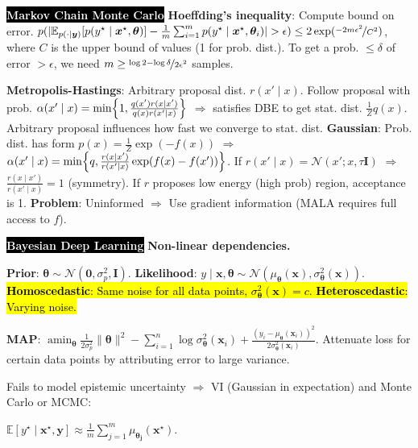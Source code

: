 \documentclass{article}
\DeclareMathOperator*{\argmin}{amin}
\newcommand{\lft}{\mathopen{}\left}
\newcommand{\rgt}{\aftergroup\mathclose\aftergroup{\aftergroup}\right}
\newcommand{\E}{\mathbb{E}}
\newenvironment{topic}[1]
{\textbf{\sffamily  \colorbox{black}{\textcolor{white}{#1}}}}
{}
\begin{document}
\begin{multicols*}{3}
\begin{topic}{Markov Chain Monte Carlo}
    \textbf{Hoeffding's inequality}: Compute bound on error. $p(|
    \E_{p(\cdot\mid\bm{y})}[p(y^\star\mid\bm{x}^\star,\bm{\theta})] -
    \frac{1}{m}\sum_{i=1}^m p(y^\star\mid\bm{x}^\star,\bm{\theta}_i) | >
    \epsilon) \leq 2\exp(\nicefrac{-2m\epsilon^2}{C^2})$, where $C$ is the
    upper bound of values (1 for prob. dist.). To get a prob. $\leq \delta$ of
    error $>\epsilon$, we need $m \geq \nicefrac{\log 2 - \log
    \delta}{2\epsilon^2}$ samples.

    \textbf{Metropolis-Hastings}: Arbitrary proposal dist. $r(x'\mid x)$.
    Follow proposal with prob. $\alpha(x'\mid x) = \min \lft\{ 1,
    \frac{q(x')r(x\mid x')}{q(x)r(x'\mid x)} \rgt\}$ $\Rightarrow$ satisfies
    DBE to get stat. dist. $\frac{1}{Z} q(x)$. Arbitrary proposal influences
    how fast we converge to stat. dist. \textbf{Gaussian}: Prob. dist. has form
    $p(x) = \frac{1}{Z}\exp(-f(x))$ $\Rightarrow$ $\alpha(x'\mid x)=\min\lft\{
      q, \frac{r(x\mid x')}{r(x'\mid x)} \exp(f(x) - f(x')) \rgt\}$. If
    $r(x'\mid x) = \mathcal{N}(x';x,\tau\bm{I})$ $\Rightarrow$ $\frac{r(x\mid
    x')}{r(x'\mid x)} = 1$ (symmetry). If $r$ proposes low energy (high prob)
    region, acceptance is 1. \textbf{Problem}: Uninformed $\Rightarrow$ Use
    gradient information (MALA requires full access to $f$).
  \end{topic}

  \begin{topic}{Bayesian Deep Learning} \textbf{Non-linear dependencies.}

    \textbf{Prior}: $\bm{\theta} \sim \mathcal{N}(\bm{0},\sigma_p^2,\bm{I})$.
    \textbf{Likelihood}: $y\mid \bm{x}, \bm{\theta} \sim
    \mathcal{N}(\mu_{\bm{\theta}}(\bm{x}), \sigma^2_{\bm{\theta}}(\bm{x}))$.
    \hl{\textbf{Homoscedastic}: Same noise for all data points,
    $\sigma^2_{\bm{\theta}}(\bm{x}) = c$. \textbf{Heteroscedastic}: Varying
    noise.}

    \textbf{MAP}: $\argmin_{\bm{\theta}} \frac{1}{2\sigma_p^2} \lVert \bm{\theta} \rVert^2 -
    \sum_{i=1}^n \log \sigma^2_{\bm{\theta}}(\bm{x}_i) + \frac{(y_i -
    \mu_{\bm{\theta}}(\bm{x}_i))^2}{2\sigma^2_{\bm{\theta}}(\bm{x}_i)}$.
    Attenuate loss for certain data points by attributing error to large
    variance.

    Fails to model epistemic uncertainty $\Rightarrow$ VI (Gaussian in
    expectation) and Monte Carlo or MCMC:

    $\E[y^\star\mid\bm{x}^\star,\bm{y}] \approx \frac{1}{m} \sum_{j=1}^m
    \mu_{\bm{\theta_j}}(\bm{x}^\star)$.


\end{topic}
\end{multicols*}
\end{document}
